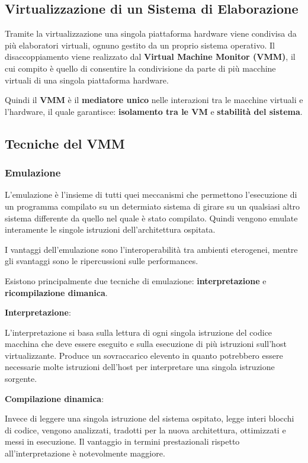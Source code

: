 \documentclass{article}
\begin{document}
\subsection{Virtualizzazione di un Sistema di Elaborazione}
Tramite la virtualizzazione una singola piattaforma hardware viene condivisa da più elaboratori virtuali, ognuno gestito da un proprio sistema operativo.
Il disaccoppiamento viene realizzato dal \textbf{Virtual Machine Monitor (VMM)}, il cui compito è quello di consentire la condivisione da parte di più macchine 
virtuali di una singola piattaforma hardware.

Quindi il \textbf{VMM} è il \textbf{mediatore unico} nelle interazioni tra le macchine virtuali e
l'hardware, il quale garantisce: \textbf{isolamento tra le VM} e \textbf{stabilità del sistema}.

\subsection{Tecniche del VMM}
\subsubsection{Emulazione}
L'emulazione è l'insieme di tutti quei meccanismi che permettono l'esecuzione di un programma compilato su un determiato sistema di girare su un qualsiasi altro sistema differente da quello nel quale è stato compilato.
Quindi vengono emulate interamente le singole istruzioni dell'architettura ospitata.

I vantaggi dell'emulazione sono l'interoperabilità tra ambienti eterogenei, mentre gli svantaggi sono le ripercussioni sulle performances.

\vspace{5mm}
Esistono principalmente due tecniche di emulazione: \textbf{interpretazione} e \textbf{ricompilazione dimanica}.

\vspace{5mm}
\textbf{Interpretazione}:

L'interpretazione si basa sulla lettura di ogni singola istruzione del codice macchina che deve essere eseguito e sulla esecuzione di più istruzioni sull'host virtualizzante.
Produce un sovraccarico elevento in quanto potrebbero essere necessarie molte istruzioni dell'host per interpretare una singola istruzione sorgente.

\vspace{5mm}
\textbf{Compilazione dinamica}:

Invece di leggere una singola istruzione del sistema ospitato, legge interi blocchi di codice, vengono analizzati, tradotti per la nuova architettura, ottimizzati e messi in esecuzione.
Il vantaggio in termini prestazionali rispetto all'interpretazione è notevolmente maggiore.
\end{document}

